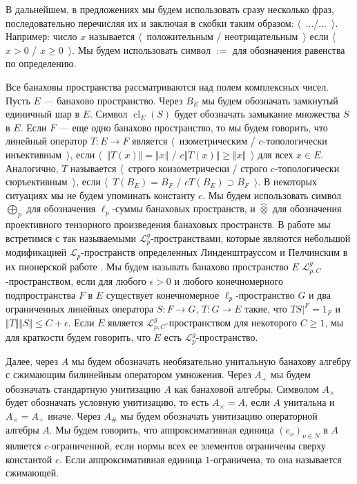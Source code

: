 \documentclass[12pt]{article}
\newcommand{\projtens}{\mathbin{\widehat{\otimes}}}
\begin{document}
В дальнейшем, в предложениях мы будем использовать сразу несколько фраз, последовательно перечисляя их и заключая в скобки таким образом: $\langle$~.../...~$\rangle$. Например: число $x$ называется $\langle$~положительным / неотрицательным~$\rangle$ если $\langle$~$x>0$ / $x\geq 0$~$\rangle$. Мы будем использовать символ $:=$ для обозначения равенства по определению.

Все банаховы пространства рассматриваются над полем комплексных чисел. Пусть $E$ --- банахово пространство. Через $B_E$ мы будем обозначать замкнутый единичный шар в $E$. Символ $\operatorname{cl}_E(S)$ будет обозначать замыкание множества $S$ в $E$. Если $F$ --- еще одно банахово пространство, то мы будем говорить, что линейный оператор $T:E\to F$ является $\langle$~изометрическим / $c$-топологически инъективным~$\rangle$, если $\langle$~$\Vert T(x)\Vert=\Vert x\Vert$ / $c\Vert T(x)\Vert\geq\Vert x\Vert$~$\rangle$ для всех $x\in E$. Аналогично, $T$ называется $\langle$~строго коизометрически / строго $c$-топологически сюръективным~$\rangle$, если $\langle$~$T(B_E)=B_F$ / $c T(B_E)\supset B_F$~$\rangle$. В некоторых ситуациях мы не будем упоминать константу $c$. Мы будем использовать символ $\bigoplus_p$ для обозначения $\ell_p$-суммы банаховых пространств, и $\projtens$ для обозначения проективного тензорного произведения банаховых пространств. В работе мы встретимся с так называемыми $\mathcal{L}_p^g$-пространствами, которые являются небольшой модификацией $\mathcal{L}_p$-пространств определенных Линденштрауссом и Пелчинским в их пионерской работе \cite{LinPelAbsSumOpInLpSpAndApp}. Мы будем называть банахово пространство $E$  $\mathcal{L}_{p,C}^g$-пространством, если для любого $\epsilon>0$ и любого конечномерного подпространства $F$ в $E$ существует конечномерное $\ell_p$-пространство $G$ и два ограниченных линейных оператора $S:F\to G$, $T:G\to E$ такие, что $TS|^F=1_F$ и $\Vert T\Vert\Vert S\Vert\leq C+\epsilon$. Если $E$ является $\mathcal{L}_{p,C}^g$-пространством для некоторого $C\geq 1$, мы для краткости будем говорить, что $E$ есть $\mathcal{L}_p^g$-пространство.

Далее, через $A$ мы будем обозначать необязательно унитальную банахову алгебру с сжимающим билинейным оператором умножения. Через $A_+$ мы будем обозначать стандартную унитизацию $A$ как банаховой алгебры. Символом $A_\times$ будет обозначать условную унитизацию, то есть $A_\times=A$, если $A$ унитальна и $A_\times=A_+$ иначе. Через $A_\#$ мы будем обозначать унитизацию операторной алгебры $A$. Мы будем говорить, что аппроксимативная единица $(e_\nu)_{\nu\in N}$ в $A$ является $c$-ограниченной, если нормы всех ее элементов ограничены сверху константой $c$. Если аппроксимативная единица $1$-ограничена, то она называется сжимающей. 
\end{document}
